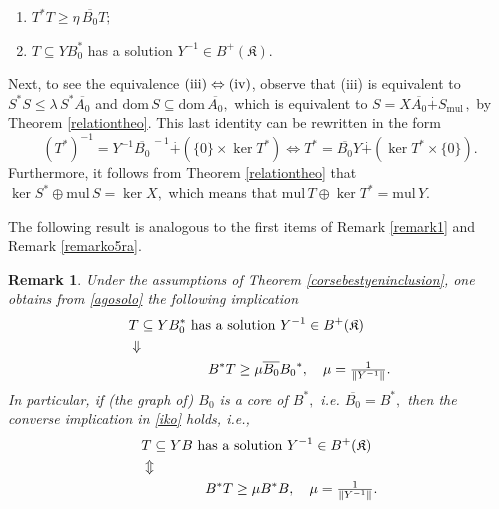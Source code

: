 \documentclass{amsart}
\makeatletter
\newtheorem{remark}[theorem]{Remark}
\newcommand{\n}{\|}
\newcommand{\ifaf}{\Leftrightarrow}
\newcommand{\kk}{\mathfrak{K}}
\newcommand{\mul}{\mathrm{mul} \, }
\newcommand{\D}{\mathrm{dom}\,}
\newcommand{\adj}{^*}
\newcommand{\inv}{^{-1}}
\newcommand{\tstar}{T^{*}}
\newcommand{\inclu}{\subseteq}
\newcommand{\lplusk}{B^{+}(\kk)}
\numberwithin{equation}{section}
\renewenvironment{proof}[1][\proofname]{%
   \par\pushQED{\qed}\normalfont%
   \topsep6\p@\@plus6\p@\relax
   \trivlist\item[\hskip\labelsep\bfseries#1\@addpunct{.}]%
   \ignorespaces
}{%
   \popQED\endtrivlist\@endpefalse
}
\makeatother
\begin{document}
\begin{proof}
\begin{enumerate}
   \item $ \tstar T   \geq  \eta \,  \overline{B_0} T ;$
   \item $  T \inclu Y B_0\adj  $ has a  solution $Y\inv \in \lplusk.$
\end{enumerate}
Next, to see the equivalence $\rm (iii) \ifaf (iv)$, observe that \rm (iii) is equivalent to $S^* S  \leq \lambda \, S\adj \overline{A_0}$ and $\D S \inclu \D \overline{A_0},$ which is equivalent to $S= X \overline{A_0} \overset{.}{+} S_{\mul},$ by  Theorem \ref{relationtheo}. This last identity can be rewritten in the form
\begin{equation*}\label{chbilia}
  (\tstar)\inv = Y\inv {\overline{B_0}}^{\, -1}  \overset{.}{+} ( \{ 0 \} \times \ker \tstar )
 \ifaf  \tstar = \overline{B_0} Y \overset{.}{+} ( \ker \tstar  \times  \{ 0 \}).
\end{equation*}
Furthermore, it follows from Theorem   \ref{relationtheo} that $\ker S\adj \oplus \mul S = \ker X,$ which means that $\mul T \oplus \ker \tstar = \mul Y.$
\end{proof}

The following result is   analogous to the first items of Remark \ref{remark1} and Remark \ref{remarko5ra}.

\begin{remark}\normalfont
Under the assumptions of Theorem \ref{corsebestyeninclusion}, one obtains from  \eqref{agosolo} the following  implication
%
\begin{eqnarray}
&T \inclu Y B_0\adj  \text{ has a solution } Y\inv \in \lplusk
    \nonumber \\
& \Downarrow\label{iko}   \\
& \hspace*{2cm} B\adj T \geq \mu  \overline{B_0} {B_0}\adj, \quad \mu = \tfrac{1}{ \n Y\inv \n}. \nonumber
\end{eqnarray}
%
In particular, if (the graph of) $B_0$ is a core of $B\adj,$ i.e.  $\overline{B_0}=B\adj,$  then the converse implication in \eqref{iko} holds, i.e.,
\begin{eqnarray}
&T \inclu Y B  \text{ has a solution } Y\inv \in \lplusk
    \nonumber \\
&  \Updownarrow \label{iko2}   \\
& \hspace*{1.6cm} B\adj T \geq \mu    {B}\adj B, \quad \mu = \tfrac{1}{ \n Y\inv \n}. \nonumber
\end{eqnarray}
\end{remark}
\end{document}
